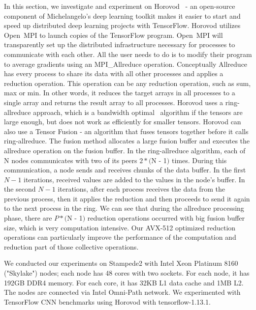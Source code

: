 \documentclass[sigconf]{acmart}
\newcommand{\ompi}[0]{Open~MPI\xspace}
\begin{document}
In this section, we investigate and experiment on Horovod~\cite{sergeev2018horovod} - an
open-source component of Michelangelo's deep learning toolkit makes it easier to start and
speed up distributed deep learning projects with TensorFlow.
%
Horovod utilizes \ompi to launch copies of the TensorFlow program. \ompi will transparently set up the distributed infrastructure necessary for processes to communicate with each other. All the user needs to do is to
modify their program to average gradients using an MPI\_Allreduce operation.
%
Conceptually Allreduce has every process to share its data with all other processes and applies a reduction operation.
This operation can be any reduction operation, such as sum, max or min.
In other words, it reduces the target arrays in all processes
to a single array and returns the result array to all processes.
%
Horovod uses a ring-allreduce approach, which is a bandwidth optimal~\cite{allreduce-optimal} algorithm if the tensors are large enough, but does not
work as efficiently for smaller tensors.
Horovod can also use a Tensor Fusion - an algorithm that fuses tensors together
before it calls ring-allreduce. The fusion method allocates a large fusion buffer and executes the
allreduce operation on the fusion buffer.
%
In the ring-allreduce algorithm, each of N nodes communicates with two of its
peers $2 * ($N - 1$)$ times. During this communication, a node sends and receives chunks of the data
buffer. In the first $N - 1$ iterations, received values are added to the values in the node's buffer. In
the second $N - 1$ iterations, after each process receives the data from the previous process, then it
applies the reduction and then proceeds to send it again to the next process in the ring.
%
We can see that during the allreduce processing phase, there are $P * ($N - 1$)$ reduction operations
occurred with big fusion buffer size, which is very computation intensive.
Our AVX-512 optimized reduction operations can particularly improve the performance
of the computation and reduction part of those collective operations.

We conducted our experiments on Stampede2 with Intel Xeon Platinum 8160 ("Skylake") nodes; each node has 48 cores with two sockets. For each node, it has 192GB DDR4 memory. For each core, it has 32KB L1 data cache and 1MB L2. The nodes are connected via Intel Omni-Path network.
We experimented with TensorFlow CNN benchmarks using Horovod with tensorflow-1.13.1.
\end{document}
